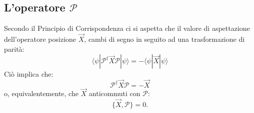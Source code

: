 \subsection{L'operatore $\mathscr{P}$} 
\noindent
Secondo il Principio di Corrispondenza ci si aspetta che il valore di aspettazione dell'operatore posizione $\vec{X}$, cambi di segno in seguito ad una trasformazione di parit\`a:
\begin{equation}
 \langle\psi|\mathscr{P}^{\dag} \vec{X} \mathscr{P}|\psi\rangle= -\langle\psi|\vec{X}|\psi\rangle
\end{equation}
Ci\`o implica che:
\begin{equation}
 \mathscr{P}^{\dag} \vec{X} \mathscr{P} = -\vec{X}
\end{equation}
o, equivalentemente, che $\vec{X}$ anticommuti con $\mathscr{P}$: 
\begin{equation}
\{\vec{X},\mathscr{P}\}=0.
\end{equation}

